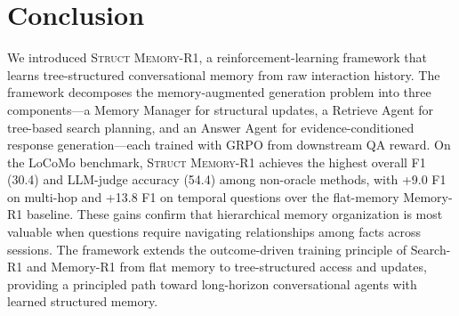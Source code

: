 \section{Conclusion}
We introduced \textsc{Struct Memory-R1}, a reinforcement-learning framework that learns tree-structured conversational memory from raw interaction history. The framework decomposes the memory-augmented generation problem into three components---a Memory Manager for structural updates, a Retrieve Agent for tree-based search planning, and an Answer Agent for evidence-conditioned response generation---each trained with GRPO from downstream QA reward. On the LoCoMo benchmark, \textsc{Struct Memory-R1} achieves the highest overall F1 (30.4) and LLM-judge accuracy (54.4) among non-oracle methods, with +9.0 F1 on multi-hop and +13.8 F1 on temporal questions over the flat-memory Memory-R1 baseline. These gains confirm that hierarchical memory organization is most valuable when questions require navigating relationships among facts across sessions. The framework extends the outcome-driven training principle of Search-R1 and Memory-R1 from flat memory to tree-structured access and updates, providing a principled path toward long-horizon conversational agents with learned structured memory.
